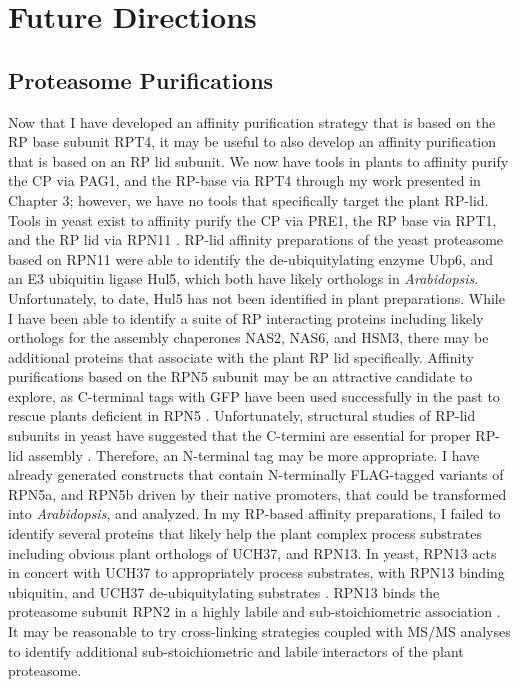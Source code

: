 \section{Future Directions}

\subsection{Proteasome Purifications}
	Now that I have developed an affinity purification strategy that is based on the RP base subunit RPT4, it may be useful to also develop an affinity purification that is based on an RP lid subunit. We now have tools in plants to affinity purify the CP via PAG1, and the RP-base via RPT4 through my work presented in Chapter 3; however, we have no tools that specifically target the plant RP-lid. Tools in yeast exist to affinity purify the CP via PRE1, the RP base via RPT1, and the RP lid via RPN11 \citep{leggett05, leggett02}. RP-lid affinity preparations of the yeast proteasome based on RPN11 were able to identify the de-ubiquitylating enzyme Ubp6, and an E3 ubiquitin ligase Hul5, which both have likely orthologs in \textit{Arabidopsis}. Unfortunately, to date, Hul5 has not been identified in plant preparations. While I have been able to identify a suite of RP interacting proteins including likely orthologs for the assembly chaperones NAS2, NAS6, and HSM3, there may be additional proteins that associate with the plant RP lid specifically. Affinity purifications based on the RPN5 subunit may be an attractive candidate to explore, as C-terminal tags with GFP have been used successfully in the past to rescue plants deficient in RPN5 \citep{book09, marshall15}. Unfortunately, structural studies of RP-lid subunits in yeast have suggested that the C-termini are essential for proper RP-lid assembly \citep{estrin13}. Therefore, an N-terminal tag may be more appropriate. I have already generated constructs that contain N-terminally FLAG-tagged variants of RPN5a, and RPN5b driven by their native promoters, that could be transformed into \textit{Arabidopsis}, and analyzed.  
In my RP-based affinity preparations, I failed to identify several proteins that likely help the plant complex process substrates including obvious plant orthologs of UCH37, and RPN13. In yeast, RPN13 acts in concert with UCH37 to appropriately process substrates, with RPN13 binding ubiquitin, and UCH37 de-ubiquitylating substrates \citep{husnjak08, jiao14}. RPN13 binds the proteasome subunit RPN2 in a highly labile and sub-stoichiometric association \citep{sakata12}. It may be reasonable to try cross-linking strategies coupled with MS/MS analyses to identify additional sub-stoichiometric and labile interactors of the plant proteasome.
  
